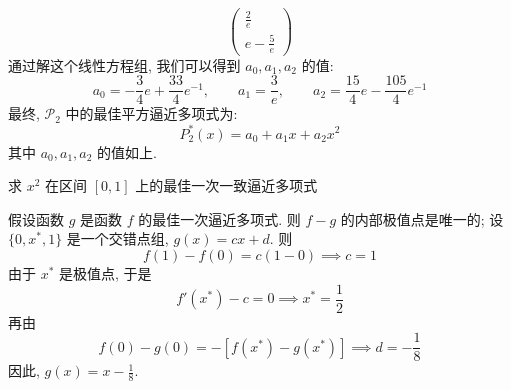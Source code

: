 \documentclass[lang = zh]{iwork}
\begin{document}
\begin{sol}
\begin{equation*}
\begin{pmatrix}
      \frac{2}{e}     \\
      e - \frac{5}{e}
    \end{pmatrix}
  \end{equation*}
  通过解这个线性方程组, 我们可以得到 $a_0, a_1, a_2$ 的值:
  \begin{equation*}
    a_0 = - \frac{3}{4} e + \frac{33}{4} e^{-1}, \qquad
    a_1 = \frac{3}{e},                           \qquad
    a_2 = \frac{15}{4} e - \frac{105}{4} e^{-1}
  \end{equation*}
  最终, $\mathscr{P}_2$ 中的最佳平方逼近多项式为:
  \begin{equation*}
    P_2^*(x) = a_0 + a_1 x + a_2 x^2
  \end{equation*}
  其中 $a_0, a_1, a_2$ 的值如上.
\end{sol}

\begin{prob}
  求 $x^2$ 在区间 $[0, 1]$ 上的最佳一次一致逼近多项式
\end{prob}
\begin{sol}
  假设函数 $g$ 是函数 $f$ 的最佳一次逼近多项式.
  则 $f - g$ 的内部极值点是唯一的;
  设 $\{ 0, x^*, 1 \}$ 是一个交错点组, $g(x) = c x + d$.
  则
  \begin{equation*}
    f(1) - f(0) = c (1 - 0)
    \implies c = 1
  \end{equation*}
  由于 $x^*$ 是极值点, 于是
  \begin{equation*}
    f'(x^*) - c = 0
    \implies x^* = \frac{1}{2}
  \end{equation*}
  再由
  \begin{equation*}
    f(0) - g(0) = -[f(x^*) - g(x^*)]
    \implies d = -\frac{1}{8}
  \end{equation*}
  因此, $g(x) = x - \frac{1}{8}$.
\end{sol}
\end{document}
